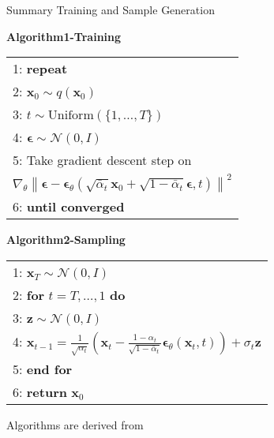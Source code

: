 \begin{refsection}
\begin{frame}{Summary}
  \centering
  {\color{purple} \small Training and Sample Generation}
  \vspace{1em}

  \begin{minipage}{0.45\linewidth}
    \scriptsize
    \textbf{Algorithm1-Training}
    \vspace{0.5em}
    \renewcommand{\arraystretch}{1.5}
    \begin{tabular}{l}
      \toprule
      1: \quad \textbf{repeat} \\
      2: \quad \hspace{1em} $\mathbf{x}_0 \sim q(\mathbf{x}_0)$ \\
      3: \quad \hspace{1em} $t \sim \mathrm{Uniform}(\{1, \ldots, T\})$ \\
      4: \quad \hspace{1em} $\boldsymbol{\epsilon} \sim \mathcal{N}(0, I)$ \\
      5: \quad \hspace{1em} Take gradient descent step on \\
      \quad \hspace{2.5em} $\nabla_\theta \left\| \boldsymbol{\epsilon} - \boldsymbol{\epsilon}_\theta\left(\sqrt{\bar{\alpha}_t} \mathbf{x}_0 + \sqrt{1 - \bar{\alpha}_t} \boldsymbol{\epsilon}, t\right) \right\|^2$ \\
      6: \quad \textbf{until converged} \\
      \bottomrule
    \end{tabular}
  \end{minipage}
  \hfill
  \renewcommand{\arraystretch}{1.5}
  \begin{minipage}{0.45\linewidth}
    \scriptsize
    \textbf{Algorithm2-Sampling}
    \vspace{0.5em}
    \begin{tabular}{l}
      \toprule
      1: \quad $\mathbf{x}_T \sim \mathcal{N}(0, I)$ \\
      2: \quad \textbf{for} $t = T, \ldots, 1$ \textbf{do} \\
      3: \quad \hspace{1em} $\mathbf{z} \sim \mathcal{N}(0, I)$ \\
      4: \quad \hspace{1em} $\mathbf{x}_{t-1} = \frac{1}{\sqrt{\alpha_t}} \left( \mathbf{x}_t - \frac{1 - \alpha_t}{\sqrt{1 - \bar{\alpha}_t}} \boldsymbol{\epsilon}_\theta(\mathbf{x}_t, t) \right) + \sigma_t \mathbf{z}$ \\
      5: \quad \textbf{end for} \\
      6: \quad \textbf{return} $\mathbf{x}_0$ \\
      \bottomrule
    \end{tabular}
  \end{minipage}
  \renewcommand{\arraystretch}{1}
  \vspace{1em}
  Algorithms are derived from~\parencite{ho2020denoising}
  \bottomleftrefs
\end{frame}
\end{refsection}


